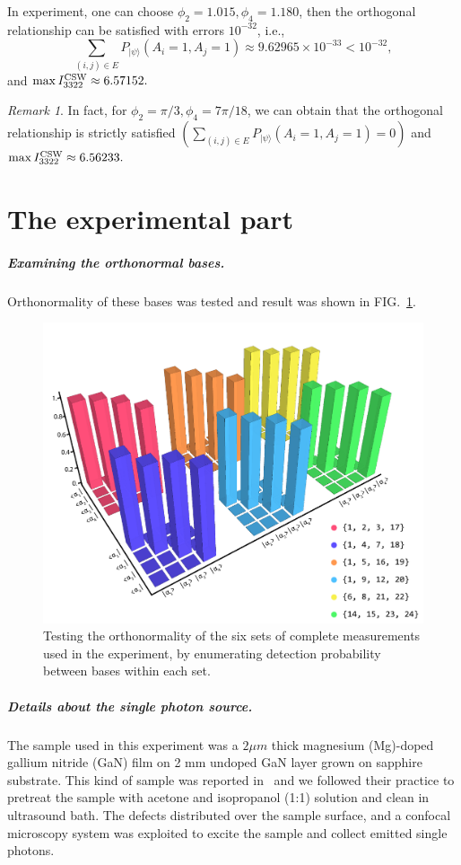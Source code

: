 \documentclass[pra,aps,notitlepage,superscriptaddress,showpacs,showkeys]{revtex4-1}
\theoremstyle{definition}
\theoremstyle{remark}
\newtheorem{remark}{Remark}
\begin{document}
In experiment, one can choose $\phi_{2}= 1.015,\phi_{4}= 1.180$, then the orthogonal relationship can be satisfied with errors $10^{-32}$, i.e.,
$$\sum_{(i,j)\in E}P_{|\psi\rangle}(A_i=1,A_j=1)\approx 9.62965\times 10^{-33}<10^{-32},$$
and $\max I_{3322}^{\rm CSW}\approx 6.57152.$

\begin{remark}
In fact, for $\phi_{2}= \pi/3,\phi_{4}=7\pi/18$, we can obtain that the orthogonal relationship is strictly satisfied  $(\sum_{(i,j)\in E}P_{|\psi\rangle}(A_i=1,A_j=1)=0)$ and $\max I_{3322}^{\rm CSW}\approx 6.56233.$
\end{remark}

\section{The experimental part}

\subparagraph{Examining the orthonormal bases.} 

Orthonormality of these bases was tested and result was shown in FIG.~\ref{fig:exp-res-1}.

 \begin{figure}[t]
     \centering
     \includegraphics[width = .53\columnwidth] {fig/exp-res-1.pdf}
     \caption{Testing the orthonormality of the six sets of complete measurements used in the experiment, by enumerating detection probability between bases within each set.}
     \label{fig:exp-res-1}
 \end{figure}

 \subparagraph{Details about the single photon source.}
 The sample used in this experiment was a $2\mu m$ thick magnesium (Mg)-doped gallium nitride (GaN) film on 2 mm undoped GaN layer grown on sapphire substrate.
 This kind of sample was reported in~\cite{qli18s} and we followed their practice to pretreat the sample with acetone and isopropanol (1:1) solution and clean in ultrasound bath.
 The defects distributed over the sample surface, and a confocal microscopy system was exploited to excite the sample and collect emitted single photons.
\end{document}
